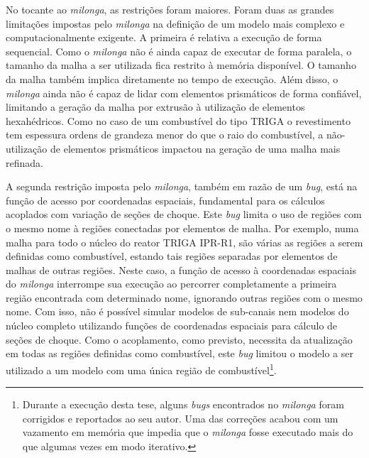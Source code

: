 No tocante ao \textit{milonga}, as restrições foram maiores. Foram duas as grandes limitações impostas
pelo \textit{milonga} na definição de um modelo mais complexo e computacionalmente exigente. A primeira
é relativa a execução de forma sequencial. Como o \textit{milonga} não é ainda capaz de executar de
forma paralela, o tamanho da malha a ser utilizada fica restrito à memória disponível.
O tamanho da malha também implica diretamente no tempo de execução.
Além disso, o \textit{milonga} ainda não é capaz de lidar com elementos prismáticos de forma confiável, limitando a
geração da malha por extrusão à utilização de elementos hexahédricos.
Como no caso de um combustível do tipo TRIGA o revestimento tem espessura ordens de grandeza
menor do que o raio do combustível, a não-utilização de elementos prismáticos impactou na geração
de uma malha mais refinada.

A segunda restrição imposta pelo \textit{milonga}, também em razão de um \textit{bug}, está na função
de acesso por coordenadas espaciais, fundamental para os cálculos acoplados com variação de seções de choque.
Este \textit{bug} limita o uso de regiões com o mesmo nome à regiões conectadas por elementos de malha.
Por exemplo, numa malha para todo o núcleo do reator TRIGA IPR-R1, são várias as regiões a serem definidas
como combustível, estando
tais regiões separadas por elementos de malhas de outras regiões. Neste caso, a função de acesso
à coordenadas espaciais do \textit{milonga} interrompe sua execução ao percorrer completamente a primeira
região encontrada com determinado nome, ignorando outras regiões com o mesmo nome.
Com isso, não é possível simular modelos de sub-canais
nem modelos do núcleo completo utilizando funções de coordenadas espaciais para cálculo de seções de choque.
Como o acoplamento, como previsto, necessita da atualização em todas as regiões definidas como combustível,
este \textit{bug} limitou o modelo a ser utilizado a um modelo com uma única região de
combustível\footnote{Durante a execução desta tese, alguns \textit{bugs} encontrados
  no \textit{milonga} foram corrigidos e
  reportados ao seu autor. Uma das correções acabou com um vazamento em memória que impedia que o \textit{milonga}
  fosse executado mais do que algumas vezes em modo iterativo.}.





